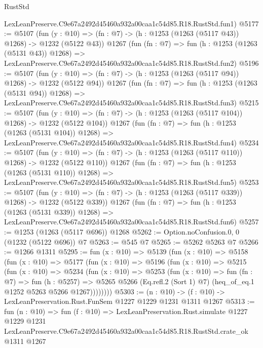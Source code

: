 \begin{lexlean}{RustStd}
\begin{coremodule}
    LexLeanPreserve.C9e67a2492d45460a932a00caa1c54d85.R18.RustStd.fun1)
@5177 := @5107
    (fun (y : @10) => (fn : @7) -> (h : @1253 (@1263 (@5117 @43)) @1268) -> @1232 (@5122 @43))
    @1267
    (fun (fn : @7) =>
    fun (h : @1253 (@1263 (@5131 @43)) @1268) =>
    LexLeanPreserve.C9e67a2492d45460a932a00caa1c54d85.R18.RustStd.fun2)
@5196 := @5107
    (fun (y : @10) => (fn : @7) -> (h : @1253 (@1263 (@5117 @94)) @1268) -> @1232 (@5122 @94))
    @1267
    (fun (fn : @7) =>
    fun (h : @1253 (@1263 (@5131 @94)) @1268) =>
    LexLeanPreserve.C9e67a2492d45460a932a00caa1c54d85.R18.RustStd.fun3)
@5215 := @5107
    (fun (y : @10) => (fn : @7) -> (h : @1253 (@1263 (@5117 @104)) @1268) -> @1232 (@5122 @104))
    @1267
    (fun (fn : @7) =>
    fun (h : @1253 (@1263 (@5131 @104)) @1268) =>
    LexLeanPreserve.C9e67a2492d45460a932a00caa1c54d85.R18.RustStd.fun4)
@5234 := @5107
    (fun (y : @10) => (fn : @7) -> (h : @1253 (@1263 (@5117 @110)) @1268) -> @1232 (@5122 @110))
    @1267
    (fun (fn : @7) =>
    fun (h : @1253 (@1263 (@5131 @110)) @1268) =>
    LexLeanPreserve.C9e67a2492d45460a932a00caa1c54d85.R18.RustStd.fun5)
@5253 := @5107
    (fun (y : @10) => (fn : @7) -> (h : @1253 (@1263 (@5117 @339)) @1268) -> @1232 (@5122 @339))
    @1267
    (fun (fn : @7) =>
    fun (h : @1253 (@1263 (@5131 @339)) @1268) =>
    LexLeanPreserve.C9e67a2492d45460a932a00caa1c54d85.R18.RustStd.fun6)
@5257 := @1253 (@1263 (@5117 @696)) @1268
@5262 := Option.noConfusion.{0, 0} (@1232 (@5122 @696)) @7
@5263 := @545 @7
@5265 := @5262 @5263 @7
@5266 := @1266 @1311
@5295 := fun (x : @10) =>
  @5139
    (fun (x : @10) =>
    @5158
      (fun (x : @10) =>
      @5177
        (fun (x : @10) =>
        @5196
          (fun (x : @10) =>
          @5215
            (fun (x : @10) =>
            @5234
              (fun (x : @10) =>
              @5253
                (fun (x : @10) =>
                fun (fn : @7) =>
                fun (h : @5257) =>
                @5265 @5266 (Eq.refl.{2} (Sort 1) @7) (heq_of_eq.{1} @1252 @5263 @5266 @1267))))))))
@5303 := (n : @10) -> (f : @10) -> LexLeanPreservation.Rust.FunSem @1227 @1229 @1231 @1311 @1267
@5313 := fun (n : @10) =>
  fun (f : @10) =>
  LexLeanPreservation.Rust.simulate
    @1227
    @1229
    @1231
    LexLeanPreserve.C9e67a2492d45460a932a00caa1c54d85.R18.RustStd.crate_ok
    @1311
    @1267
\end{coremodule}
\end{lexlean}
